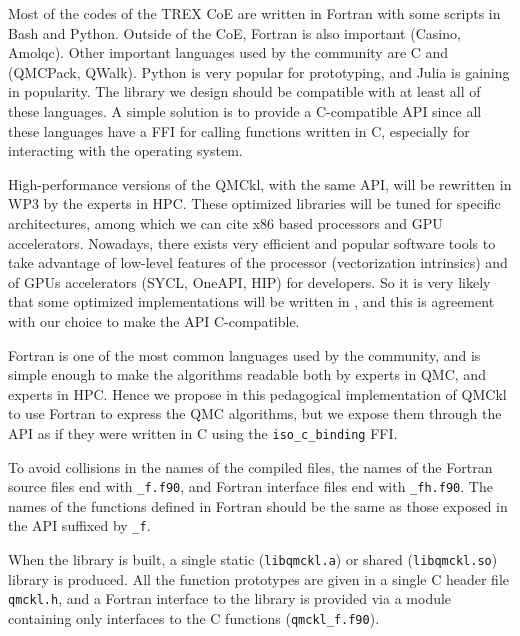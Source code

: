 Most of the codes of the \ac{TREX} \ac{CoE} are written in Fortran
with some scripts in Bash and Python. Outside of the
\ac{CoE}, Fortran is also important (Casino, Amolqc). Other
important languages used by the community are C and {\CC} (QMCPack,
QWalk). Python is very popular for prototyping, and Julia is gaining
in popularity\cite{poole_2020}. The library we design should be
compatible with at least all of these languages. A simple solution is
to provide a C-compatible \ac{API} since all these languages have a
\ac{FFI} for calling functions written in C, especially for
interacting with the operating system.

High-performance versions of the \ac{QMCkl}, with the same \ac{API},
will be rewritten in \ac{WP}3 by the experts in \ac{HPC}. These
optimized libraries will be tuned for specific architectures, among
which we can cite x86 based processors and \ac{GPU} accelerators.
Nowadays, there exists very efficient and popular software tools to
take advantage of low-level features of the processor\cite{pohl_2016}
(vectorization intrinsics) and of \acp{GPU} accelerators (SYCL\cite{SYCL},
OneAPI, HIP) for {\CC} developers. So it is very likely
that some optimized implementations will be written in {\CC}, and this
is agreement with our choice to make the \ac{API} C-compatible.

Fortran is one of the most common languages used by the community, and
is simple enough to make the algorithms readable both by experts in
\ac{QMC}, and experts in \ac{HPC}. Hence we propose in this
pedagogical implementation of \ac{QMCkl} to use Fortran to express the
QMC algorithms, but we expose them through the \ac{API} as if they
were written in C using the \texttt{iso_c_binding} \ac{FFI}.

To avoid collisions in the names of the compiled files, the names of
the Fortran source files end with \texttt{_f.f90}, and Fortran
interface files end with \texttt{_fh.f90}.
The names of the functions defined in Fortran should be the
same as those exposed in the \ac{API} suffixed by \texttt{_f}.

When the library is built, a single static
(\texttt{libqmckl.a}) or shared
(\texttt{libqmckl.so}) library is produced. All the
function prototypes are given in a single C header file
\texttt{qmckl.h}, and a Fortran interface to the library is
provided via a module containing only interfaces to the C functions
(\texttt{qmckl_f.f90}).

